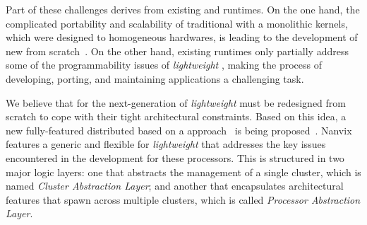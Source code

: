    Part of these challenges derives from existing \oses and runtimes.
    On the one hand, the complicated portability and scalability of traditional \oses with a monolithic kernels, which were designed to homogeneous hardwares, is leading to the development of new \oses from scratch~\cite{Baumann2009, kluge2014, nightingale2009, rhoden2011}.
    On the other hand, existing runtimes only partially address some of the programmability issues of \textit{lightweight} \manycores, making the process of developing, porting, and maintaining applications a challenging task.




    We believe that \oses for the next-generation of \textit{lightweight} \manycores must be redesigned from scratch to cope with their tight architectural constraints. Based on this idea, a new fully-featured distributed \os based on a \multikernel approach~\cite{Baumann2009} is being proposed~\cite{penna2017-1,penna2017-2,penna2019}. Nanvix features a generic and flexible \hal for \textit{lightweight} \manycores that addresses the key issues encountered in the development for these processors. This \hal is structured in two major logic layers: one that abstracts the management of a single cluster, which is named \textit{Cluster Abstraction Layer}; and another that encapsulates architectural features that spawn across multiple clusters, which is called \textit{Processor Abstraction Layer}.


